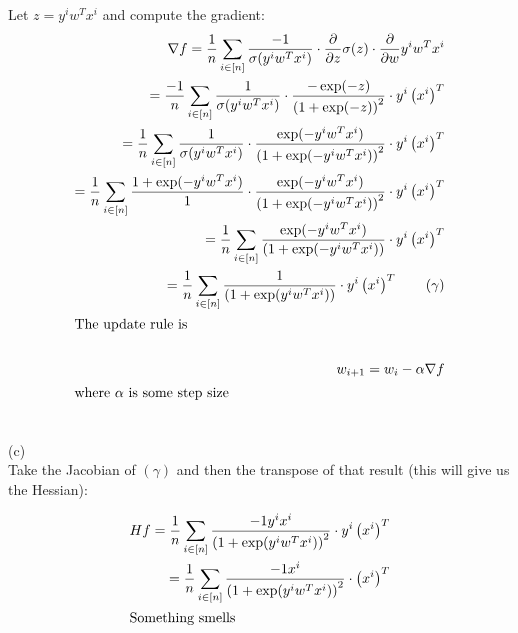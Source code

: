 \documentclass[../main.tex]{subfiles}
\begin{document}
Let $z = y^{i}w^Tx^{i}$ and compute the gradient:
\begin{align*}
    \nabla f = \frac{1}{n}\sum_{i \in [n]}^{}\frac{-1}{\sigma(y^{i}w^Tx^{i})} \cdot \frac{\partial}{\partial z}\sigma(z) \cdot \frac{\partial}{\partial w}y^{i}w^{T}x^{i} \\ 
    = \frac{-1}{n}\sum_{i \in [n]}^{}\frac{1}{\sigma(y^{i}w^Tx^{i})} \cdot \frac{-\exp(-z)}{\left(1 + \exp(-z)\right)^2}  \cdot y^{i}\left(x^{i}\right)^T \\ 
    = \frac{1}{n}\sum_{i \in [n]}^{}\frac{1}{\sigma(y^{i}w^Tx^{i})} \cdot \frac{\exp(-y^{i}w^Tx^{i})}{\left(1 + \exp(-y^{i}w^Tx^{i})\right)^2}  \cdot y^{i}\left(x^{i}\right)^T \\ 
    = \frac{1}{n}\sum_{i \in [n]}^{}\frac{1 + \exp(-y^{i}w^Tx^{i})}{1} \cdot \frac{\exp(-y^{i}w^Tx^{i})}{\left(1 + \exp(-y^{i}w^Tx^{i})\right)^2}  \cdot y^{i}\left(x^{i}\right)^T \\ 
    = \frac{1}{n}\sum_{i \in [n]}^{}\frac{\exp(-y^{i}w^Tx^{i})}{\left(1 + \exp(-y^{i}w^Tx^{i})\right)}  \cdot y^{i}\left(x^{i}\right)^T \\ 
    = \frac{1}{n}\sum_{i \in [n]}^{}\frac{1}{\left(1 + \exp(y^{i}w^Tx^{i})\right)}  \cdot y^{i}\left(x^{i}\right)^T \tag{$\gamma$}\\ 
    \intertext{The update rule is} \\
    w_{i+1} = w_{i} - \alpha \nabla f \\
    \intertext{where $\alpha$ is some step size} \\
\end{align*}


(c) \\

Take the Jacobian of $(\gamma)$ and then the transpose of that result (this will give us the Hessian):

\begin{align*}
    H f = \frac{1}{n}\sum_{i\in [n]}^{}\frac{-1 y^{i}x^{i}}{\left(1 + \exp(y^{i}w^Tx^{i})\right)^2}\cdot y^{i}\left(x^{i}\right)^T \\
    = \frac{1}{n}\sum_{i\in [n]}^{}\frac{-1 x^{i}}{\left(1 + \exp(y^{i}w^Tx^{i})\right)^2}\cdot \left(x^{i}\right)^T \\
    \intertext{Something smells} \\
\end{align*}




\newpage \nocite{*}


\end{document}

